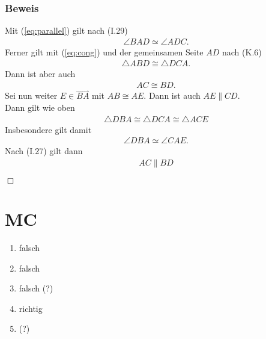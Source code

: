 \documentclass[11pt]{article}
\newcommand{\ray}[1]{\stackrel{\rightharpoonup}{#1}}
\begin{document}
\subsubsection*{Beweis}
Mit (\ref{eq:parallel}) gilt nach (I.29)
\begin{equation*}
\begin{aligned}
\angle BAD \simeq \angle ADC.
\end{aligned}
\end{equation*}
Ferner gilt mit (\ref{eq:cong}) und der gemeinsamen Seite $ AD $ nach (K.6)
\begin{equation*}
\begin{aligned}
\triangle ABD \cong \triangle DCA.
\end{aligned}
\end{equation*}
Dann ist aber auch
\begin{equation*}
\begin{aligned}
AC \cong BD.
\end{aligned}
\end{equation*}
Sei nun weiter $ E \in \ray{BA} $ mit $ AB \cong AE $. Dann ist auch $ AE \parallel CD $.\\
Dann gilt wie oben
\begin{equation*}
\begin{aligned}
\triangle DBA \cong \triangle DCA \cong \triangle ACE
\end{aligned}
\end{equation*}
Insbesondere gilt damit
\begin{equation*}
\begin{aligned}
\angle DBA \simeq \angle CAE.
\end{aligned}
\end{equation*}
Nach (I.27) gilt dann
\begin{equation*}
\begin{aligned}
AC \parallel BD
\end{aligned}
\end{equation*}
\begin{flushright}
	$ \Box $
\end{flushright}
\section*{MC}
\begin{enumerate}
	\item falsch
	\item falsch
	\item falsch (?)
	\item richtig
	\item (?)
\end{enumerate}
\end{document}
